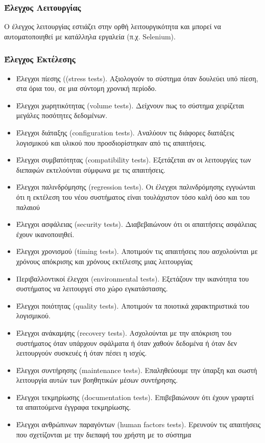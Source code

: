 \documentclass[a4paper, 11pt]{article}
\begin{document}
{{\subsubsection{Έλεγχος Λειτουργίας}
Ο έλεγχος λειτουργίας εστιάζει στην ορθή λειτουργικότητα και
μπορεί να αυτοματοποιηθεί με κατάλληλα εργαλεία (π.χ. \textlatin{Selenium}).
\subsubsection{Έλεγχος Εκτέλεσης}
\begin{itemize}
\item Έλεγχοι πίεσης (\textlatin{(stress tests)}. Aξιολογούν το σύστημα όταν δουλεύει υπό πίεση, στα όρια του, σε μια σύντομη χρονική περίοδο.
\item Έλεγχοι χωρητικότητας \textlatin{(volume tests)}.  Δείχνουν πως το σύστημα χειρίζεται μεγάλες ποσότητες δεδομένων.
\item Έλεγχοι διάταξης \textlatin{(configuration tests)}. Αναλύουν τις διάφορες διατάξεις λογισμικού και υλικού που προσδιορίστηκαν από τις απαιτήσεις.
\item Έλεγχοι συμβατότητας \textlatin{(compatibility tests)}. Εξετάζεται αν οι λειτουργίες των διεπαφών εκτελούνται σύμφωνα με τις απαιτήσεις. 
\item Έλεγχοι παλινδρόμησης \textlatin{(regression tests)}. Οι έλεγχοι παλινδρόμησης εγγυώνται ότι η εκτέλεση του νέου συστήματος είναι τουλάχιστον τόσο καλή όσο και του παλαιού
\item Έλεγχοι ασφάλειας \textlatin{(security tests)}.  Διαβεβαιώνουν ότι οι απαιτήσεις ασφάλειας έχουν ικανοποιηθεί.
\item Έλεγχοι χρονισμού \textlatin{(timing tests)}.  Αποτιμούν τις απαιτήσεις που ασχολούνται με χρόνους απόκρισης και χρόνους εκτέλεσης μιας λειτουργίας
\item Περιβαλλοντικοί έλεγχοι \textlatin{(environmental tests)}. Εξετάζουν την ικανότητα του συστήματος να λειτουργεί στο χώρο εγκατάστασης. 
\item Έλεγχοι ποιότητας \textlatin{(quality tests)}. Αποτιμούν τα ποιοτικά χαρακτηριστικά του λογισμικού.
\item Έλεγχοι ανάκαμψης \textlatin{(recovery tests)}. Ασχολούνται με την απόκριση του συστήματος όταν υπάρχουν σφάλματα ή όταν χαθούν δεδομένα ή όταν δεν λειτουργούν συσκευές ή όταν πέσει η ισχύς. 
\item Έλεγχοι συντήρησης \textlatin{(maintenance tests)}. Επαληθεύουμε την ύπαρξη και σωστή λειτουργία αυτών των βοηθητικών μέσων συντήρησης.
\item Έλεγχοι τεκμηρίωσης \textlatin{(documentation tests)}. Επιβεβαιώνουν ότι έχουν γραφτεί τα απαιτούμενα έγγραφα τεκμηρίωσης.
\item Έλεγχοι ανθρώπινων παραγόντων \textlatin{(human factors tests)}. Ερευνούν τις απαιτήσεις που σχετίζονται με την διεπαφή του χρήστη με το σύστημα
\end{itemize}

}}
\end{document}
